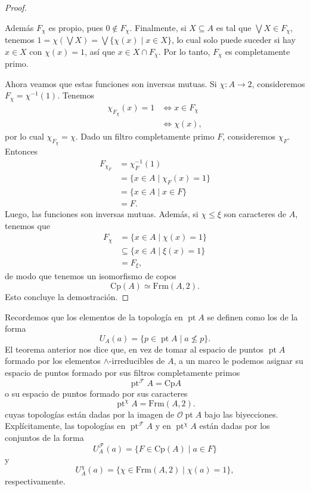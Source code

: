 \documentclass[12pt,letterpaper,titlepage]{article}
\theoremstyle{definition}
\newcommand\Sup{\bigvee}
\renewcommand\inf{\wedge}
\renewcommand\cal[1]{\mathcal{#1}}
\newcommand\<{\langle}
\renewcommand\>{\rangle}
\newcommand{\Frm}{\mathrm{Frm}}
\newcommand{\Cp}{\mathrm{Cp}}
\DeclareMathOperator{\pt}{pt}
\begin{document}
\begin{proof}
\begin{itemize}
        Además $F_\chi$ es propio, pues $0\nin F_\chi$.
        Finalmente, si $X\subseteq A$ es tal que
        $\Sup X\in F_\chi$,
        tenemos $1=\chi(\Sup X)=\Sup\{\chi(x)\mid x\in X\}$,
        lo cual solo puede suceder si hay $x\in X$ con $\chi(x)=1$,
        así que $x\in X\cap F_\chi$.
        Por lo tanto, $F_\chi$ es completamente primo.
    \end{itemize}
    Ahora veamos que estas funciones son inversas mutuas.
    Si $\chi:A\to 2$, consideremos $F_\chi=\chi^{-1}(1)$.
    Tenemos
    \begin{align*}
        \chi_{F_\chi}(x) = 1
        &\iff x\in F_\chi \\
        &\iff \chi(x),
    \end{align*}
    por lo cual $\chi_{F_\chi}=\chi$.
    Dado un filtro completamente primo $F$, consideremos
    $\chi_F$.
    Entonces
    \begin{align*}
        F_{\chi_F}
        &= \chi_F^{-1}(1) \\
        &= \{x\in A\mid \chi_F(x)=1 \} \\
        &= \{x\in A\mid x\in F\} \\
        &= F.
    \end{align*}
    Luego, las funciones son inversas mutuas.
    Además, si $\chi\leq\xi$ son caracteres de $A$,
    tenemos que
    \begin{align*}
        F_\chi
        &= \{x\in A\mid \chi(x)=1\} \\
        &\subseteq \{x\in A\mid \xi(x)=1\} \\
        &= F_\xi,
    \end{align*}
    de modo que tenemos un isomorfismo de copos
    \[
        \Cp(A) \simeq \Frm(A,2).
    \]
    Esto concluye la demostración.
\end{proof}

Recordemos que los elementos de la topología en $\pt A$
se definen como los de la forma
\[
    U_A(a) = \{p\in\pt A\mid a\nleq p\}.
\]
El teorema anterior nos dice que, en vez de tomar
al espacio de puntos $\pt A$ formado por los elementos
$\inf$-irreducibles de $A$, a un marco le podemos asignar
su espacio de puntos formado por sus filtros completamente primos
\[
    \pt^{\cal F} A = \Cp A
\]
o su espacio de puntos formado por sus caracteres
\[
    \pt^\chi A = \Frm(A,2).
\]
cuyas topologías están dadas por la imagen de $\cal O\pt A$
bajo las biyecciones.\\
Explícitamente, las topologías en $\pt^{\cal F}A$
y en $\pt^\chi A$ están dadas por los conjuntos de la forma
\[
    U^{\cal F}_A(a) = \{F\in\Cp(A) \mid a\in F\}
\]
y
\[
    U^\chi_A(a) = \{\chi\in\Frm(A,2)\mid\chi(a)=1\},
\]
respectivamente.
\end{document}
